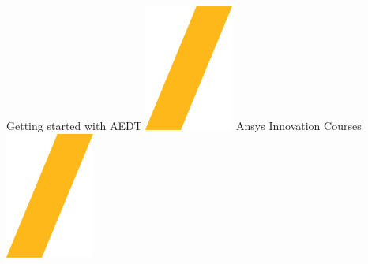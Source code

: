\documentclass[landscape]{article}
\begin{document}
\noindent\makebox[\linewidth]{\rule{\paperwidth}{4pt}}
\begin{center}
Getting started with AEDT \includegraphics[height=\fontcharht\font`\S]{slash.png} Ansys Innovation Courses \includegraphics[height=\fontcharht\font`\S]{slash.png} %
\end{center}
\end{document}
